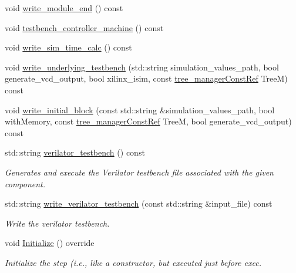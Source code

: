 \begin{DoxyCompactItemize}
\item 
void \hyperlink{classTestbenchGenerationBaseStep_ae306dc453042f5b49d7a0a7efdbd094a}{write\+\_\+module\+\_\+end} () const
\item 
void \hyperlink{classTestbenchGenerationBaseStep_ababf761d897357b1854543acc24547ae}{testbench\+\_\+controller\+\_\+machine} () const
\item 
void \hyperlink{classTestbenchGenerationBaseStep_a26f47a71a80495e7ee72fd5d56a0d647}{write\+\_\+sim\+\_\+time\+\_\+calc} () const
\item 
void \hyperlink{classTestbenchGenerationBaseStep_a6feec8a1c8dc902e8b9644a956f878a4}{write\+\_\+underlying\+\_\+testbench} (std\+::string simulation\+\_\+values\+\_\+path, bool generate\+\_\+vcd\+\_\+output, bool xilinx\+\_\+isim, const \hyperlink{tree__manager_8hpp_a792e3f1f892d7d997a8d8a4a12e39346}{tree\+\_\+manager\+Const\+Ref} TreeM) const
\item 
void \hyperlink{classTestbenchGenerationBaseStep_a8bfbb6d0854685400127ee0ed68908cd}{write\+\_\+initial\+\_\+block} (const std\+::string \&simulation\+\_\+values\+\_\+path, bool with\+Memory, const \hyperlink{tree__manager_8hpp_a792e3f1f892d7d997a8d8a4a12e39346}{tree\+\_\+manager\+Const\+Ref} TreeM, bool generate\+\_\+vcd\+\_\+output) const
\item 
std\+::string \hyperlink{classTestbenchGenerationBaseStep_a5df6c949ea78186f4c6a47f80e68aa3e}{verilator\+\_\+testbench} () const
\begin{DoxyCompactList}\small\item\em Generates and execute the Verilator testbench file associated with the given component. \end{DoxyCompactList}\item 
std\+::string \hyperlink{classTestbenchGenerationBaseStep_a58c9e59ffac01539a187a955b038413f}{write\+\_\+verilator\+\_\+testbench} (const std\+::string \&input\+\_\+file) const
\begin{DoxyCompactList}\small\item\em Write the verilator testbench. \end{DoxyCompactList}\item 
void \hyperlink{classTestbenchGenerationBaseStep_a3c3722de551d16d1d2b9c0fa22e73bcb}{Initialize} () override
\begin{DoxyCompactList}\small\item\em Initialize the step (i.\+e., like a constructor, but executed just before exec. \end{DoxyCompactList}\item 

\end{DoxyCompactItemize}
